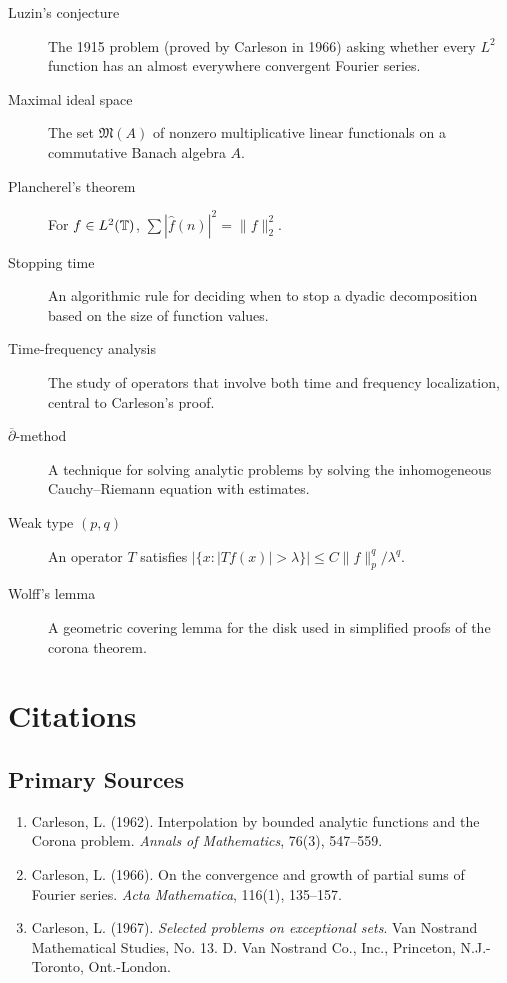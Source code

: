 \begin{description}
    \item[Luzin's conjecture] The 1915 problem (proved by Carleson in 1966) asking whether every \(L^2\) function has an almost everywhere convergent Fourier series.
    \item[Maximal ideal space] The set \(\mathfrak{M}(A)\) of nonzero multiplicative linear functionals on a commutative Banach algebra \(A\).
    \item[Plancherel's theorem] For \(f \in L^2(\mathbb{T})\), \(\sum |\widehat{f}(n)|^2 = \|f\|_2^2\).
    \item[Stopping time] An algorithmic rule for deciding when to stop a dyadic decomposition based on the size of function values.
    \item[Time-frequency analysis] The study of operators that involve both time and frequency localization, central to Carleson's proof.
    \item[\(\overline{\partial}\)-method] A technique for solving analytic problems by solving the inhomogeneous Cauchy--Riemann equation with estimates.
    \item[Weak type \((p,q)\)] An operator \(T\) satisfies \(|\{x : |T f(x)| > \lambda\}| \leq C \|f\|_p^q / \lambda^q\).
    \item[Wolff's lemma] A geometric covering lemma for the disk used in simplified proofs of the corona theorem.
\end{description}

\section{Citations}

\subsection*{Primary Sources}
\begin{enumerate}
    \item Carleson, L. (1962). Interpolation by bounded analytic functions and the Corona problem. \textit{Annals of Mathematics}, 76(3), 547--559.
    \item Carleson, L. (1966). On the convergence and growth of partial sums of Fourier series. \textit{Acta Mathematica}, 116(1), 135--157.
    \item Carleson, L. (1967). \textit{Selected problems on exceptional sets}. Van Nostrand Mathematical Studies, No. 13. D. Van Nostrand Co., Inc., Princeton, N.J.-Toronto, Ont.-London.
\end{enumerate}

